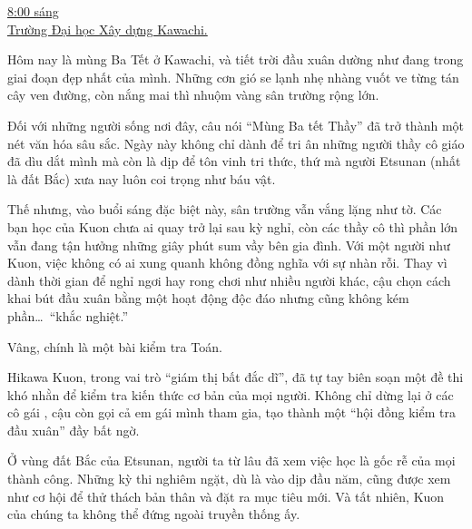 \documentclass[../main.tex]{subfiles}
\begin{document}
\begin{center}
    \uline{8:00 sáng\\Trường Đại học Xây dựng Kawachi.}
\end{center}

Hôm nay là mùng Ba Tết ở Kawachi, và tiết trời đầu xuân dường như đang trong giai đoạn đẹp nhất của mình. Những cơn gió se lạnh nhẹ nhàng vuốt ve từng tán cây ven đường, còn nắng mai thì nhuộm vàng sân trường rộng lớn.

Đối với những người sống nơi đây, câu nói ``Mùng Ba tết Thầy'' đã trở thành một nét văn hóa sâu sắc. Ngày này không chỉ dành để tri ân những người thầy cô giáo đã dìu dắt mình mà còn là dịp để tôn vinh tri thức, thứ mà người Etsunan (nhất là đất Bắc) xưa nay luôn coi trọng như báu vật.

Thế nhưng, vào buổi sáng đặc biệt này, sân trường vẫn vắng lặng như tờ. Các bạn học của Kuon chưa ai quay trở lại sau kỳ nghỉ, còn các thầy cô thì phần lớn vẫn đang tận hưởng những giây phút sum vầy bên gia đình. Với một người như Kuon, việc không có ai xung quanh không đồng nghĩa với sự nhàn rỗi. Thay vì dành thời gian để nghỉ ngơi hay rong chơi như nhiều người khác, cậu chọn cách khai bút đầu xuân bằng một hoạt động độc đáo nhưng cũng không kém phần\dots\ ``khắc nghiệt.''

Vâng, chính là một bài kiểm tra Toán.

Hikawa Kuon, trong vai trò ``giám thị bất đắc dĩ'', đã tự tay biên soạn một đề thi khó nhằn để kiểm tra kiến thức cơ bản của mọi người. Không chỉ dừng lại ở các cô gái \hll, cậu còn gọi cả em gái mình tham gia, tạo thành một ``hội đồng kiểm tra đầu xuân'' đầy bất ngờ.

Ở vùng đất Bắc của Etsunan, người ta từ lâu đã xem việc học là gốc rễ của mọi thành công. Những kỳ thi nghiêm ngặt, dù là vào dịp đầu năm, cũng được xem như cơ hội để thử thách bản thân và đặt ra mục tiêu mới. Và tất nhiên, Kuon của chúng ta không thể đứng ngoài truyền thống ấy.
\end{document}
